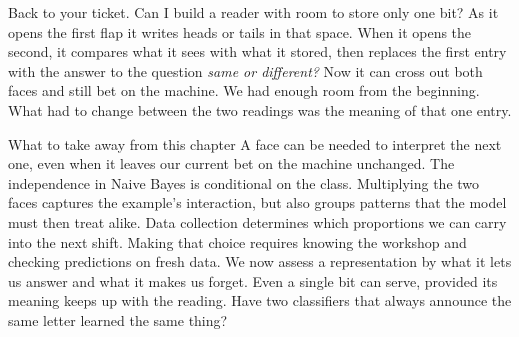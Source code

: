 Back to your ticket. Can I build a reader with room to store only one bit? As it opens the first flap it writes heads or tails in that space. When it opens the second, it compares what it sees with what it stored, then replaces the first entry with the answer to the question \emph{same or different?} Now it can cross out both faces and still bet on the machine. We had enough room from the beginning. What had to change between the two readings was the meaning of that one entry.

\begin{quadro}{What to take away from this chapter}
 A face can be needed to interpret the next one, even when it leaves our current bet on the machine unchanged.
 The independence in Naive Bayes is conditional on the class. Multiplying the two faces captures the example's interaction, but also groups patterns that the model must then treat alike.
 Data collection determines which proportions we can carry into the next shift. Making that choice requires knowing the workshop and checking predictions on fresh data.
 We now assess a representation by what it lets us answer and what it makes us forget. Even a single bit can serve, provided its meaning keeps up with the reading.
 Have two classifiers that always announce the same letter learned the same thing?
\end{quadro}
